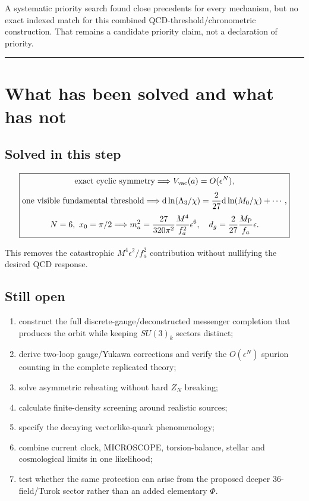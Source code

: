 \documentclass[11pt,a4paper]{article}
\providecommand{\tightlist}{\setlength{\itemsep}{0pt}\setlength{\parskip}{0pt}}
\begin{document}
A systematic priority search found close precedents for every mechanism,
but no exact indexed match for this combined QCD-threshold/chronometric
construction. That remains a candidate priority claim, not a declaration
of priority.

\begin{center}\rule{0.5\linewidth}{0.5pt}\end{center}

\section{What has been solved and what has
not}\label{what-has-been-solved-and-what-has-not}

\subsection{Solved in this step}\label{solved-in-this-step}

\[
\boxed{
\begin{gathered}
\text{exact cyclic symmetry}
\Longrightarrow
V_{\rm vac}(a)=O(\epsilon^N),\\[1mm]
\text{one visible fundamental threshold}
\Longrightarrow
\mathrm d\ln(\Lambda_3/\chi)
=\frac{2}{27}\mathrm d\ln(M_0/\chi)+\cdots,\\[1mm]
N=6,\ x_0=\pi/2
\Longrightarrow
m_a^2=\frac{27}{320\pi^2}\frac{M^4}{f_a^2}\epsilon^6,
\quad
d_g=\frac{2}{27}\frac{M_{\rm P}}{f_a}\epsilon.
\end{gathered}
}
\]

This removes the catastrophic \(M^4\epsilon^2/f_a^2\) contribution
without nullifying the desired QCD response.

\subsection{Still open}\label{still-open}

\begin{enumerate}
\def\labelenumi{\arabic{enumi}.}
\tightlist
\item
  construct the full discrete-gauge/deconstructed messenger completion
  that produces the orbit while keeping \(SU(3)_k\) sectors distinct;
\item
  derive two-loop gauge/Yukawa corrections and verify the
  \(O(\epsilon^N)\) spurion counting in the complete replicated theory;
\item
  solve asymmetric reheating without hard \(Z_N\) breaking;
\item
  calculate finite-density screening around realistic sources;
\item
  specify the decaying vectorlike-quark phenomenology;
\item
  combine current clock, MICROSCOPE, torsion-balance, stellar and
  cosmological limits in one likelihood;
\item
  test whether the same protection can arise from the proposed deeper
  36-field/Turok sector rather than an added elementary \(\Phi\).
\end{enumerate}
\end{document}
